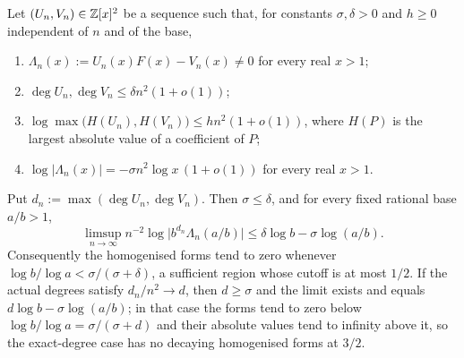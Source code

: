\documentclass[11pt]{article}
\begin{document}
\begin{theorem}\label{long1049:res:archcap}
Let $(U_n,V_n)\in\mathbb{Z}[x]^{2}$ be a sequence such that, for constants
$\sigma,\delta>0$ and $h\ge0$ independent of $n$ and of the base,
\begin{enumerate}
\item $\Lambda_n(x):=U_n(x)F(x)-V_n(x)\ne0$ for every real $x>1$;
\item $\deg U_n,\deg V_n\le\delta n^{2}(1+o(1))$;
\item $\log\max\bigl(H(U_n),H(V_n)\bigr)\le hn^{2}(1+o(1))$, where $H(P)$ is the
largest absolute value of a coefficient of $P$;
\item $\log|\Lambda_n(x)|=-\sigma n^{2}\log x\,(1+o(1))$ for every real $x>1$.
\end{enumerate}
Put $d_n:=\max(\deg U_n,\deg V_n)$.  Then $\sigma\le\delta$, and for every fixed
rational base $a/b>1$,
\[
 \limsup_{n\to\infty}n^{-2}\log\bigl|b^{d_n}\Lambda_n(a/b)\bigr|
 \le\delta\log b-\sigma\log(a/b).
\]
Consequently the homogenised forms tend to zero whenever
$\log b/\log a<\sigma/(\sigma+\delta)$, a sufficient region whose cutoff is at
most $1/2$.  If the actual degrees satisfy $d_n/n^{2}\to d$, then $d\ge\sigma$
and the limit exists and equals $d\log b-\sigma\log(a/b)$; in that case the
forms tend to zero below $\log b/\log a=\sigma/(\sigma+d)$ and their absolute
values tend to infinity above it, so the exact-degree case has no decaying
homogenised forms at $3/2$.
\end{theorem}
\end{document}
